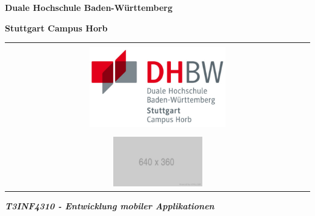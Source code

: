 \titlepage
\begin{center}
    \textbf{\large{}Duale Hochschule Baden-Württemberg }{\large\par}
    \par
\end{center}
\begin{center}
    \textbf{\large{}Stuttgart Campus Horb}{\large\par}
    \par
\end{center}
\begin{center}
    \begin{tabular}{l||r}
        \multicolumn{2}{c}{\vspace{1cm}}
        \tabularnewline
        \multicolumn{2}{c}{\includegraphics[height=3.5cm]{images/dhbwlogo}}
        \tabularnewline
        \multicolumn{2}{c}{}
        \tabularnewline
        \multicolumn{2}{c}{\includegraphics[width=0.3\textwidth, scale=1]{images/placeholder.png}}
        \tabularnewline
    \end{tabular}
    \par
\end{center}
\vspace{0.5cm}

\begin{flushleft}
    \textbf{\Large{}\title{}}{\Large\par}
    \par
\end{flushleft}

\begin{flushleft}
    \textbf{\textit{T3INF4310 - Entwicklung mobiler Applikationen}}
    \par
\end{flushleft}

